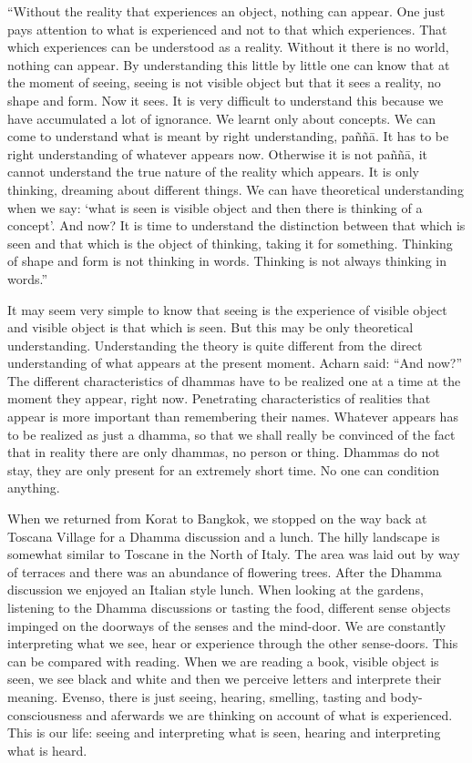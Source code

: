 ``Without the reality that experiences an object, nothing can appear.
One just pays attention to what is experienced and not to that which
experiences. That which experiences can be understood as a reality.
Without it there is no world, nothing can appear. By understanding this
little by little one can know that at the moment of seeing, seeing is
not visible object but that it sees a reality, no shape and form. Now it
sees. It is very difficult to understand this because we have
accumulated a lot of ignorance. We learnt only about concepts. We can
come to understand what is meant by right understanding, paññā. It has
to be right understanding of whatever appears now. Otherwise it is not
paññā, it cannot understand the true nature of the reality which
appears. It is only thinking, dreaming about different things. We can
have theoretical understanding when we say: `what is seen is visible
object and then there is thinking of a concept'. And now? It is time to
understand the distinction between that which is seen and that which is
the object of thinking, taking it for something. Thinking of shape and
form is not thinking in words. Thinking is not always thinking in
words.''

It may seem very simple to know that seeing is the experience of visible
object and visible object is that which is seen. But this may be only
theoretical understanding. Understanding the theory is quite different
from the direct understanding of what appears at the present moment.
Acharn said: ``And now?'' The different characteristics of dhammas have
to be realized one at a time at the moment they appear, right now.
Penetrating characteristics of realities that appear is more important
than remembering their names. Whatever appears has to be realized as
just a dhamma, so that we shall really be convinced of the fact that in
reality there are only dhammas, no person or thing. Dhammas do not stay,
they are only present for an extremely short time. No one can condition
anything.

When we returned from Korat to Bangkok, we stopped on the way back at
Toscana Village for a Dhamma discussion and a lunch. The hilly landscape
is somewhat similar to Toscane in the North of Italy. The area was laid
out by way of terraces and there was an abundance of flowering trees.
After the Dhamma discussion we enjoyed an Italian style lunch. When
looking at the gardens, listening to the Dhamma discussions or tasting
the food, different sense objects impinged on the doorways of the senses
and the mind-door. We are constantly interpreting what we see, hear or
experience through the other sense-doors. This can be compared with
reading. When we are reading a book, visible object is seen, we see
black and white and then we perceive letters and interprete their
meaning. Evenso, there is just seeing, hearing, smelling, tasting and
body-consciousness and aferwards we are thinking on account of what is
experienced. This is our life: seeing and interpreting what is seen,
hearing and interpreting what is heard.

